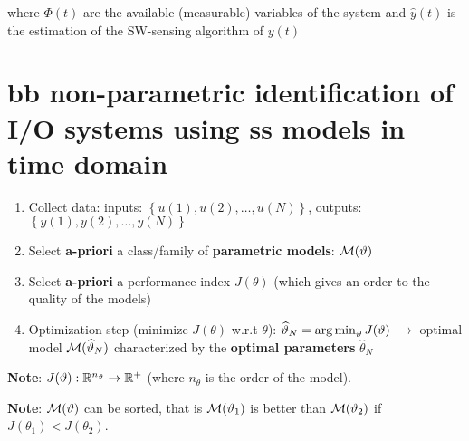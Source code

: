 where $\Phi(t)$ are the available (measurable) variables of the system and $\hat{y}(t)$ is the estimation of the SW-sensing algorithm of $y(t)$

\chapter{\acrlong{bb} non-parametric identification of I/O systems using \acrlong{ss} models in time domain}

\vspace{-12pt}
\begin{figure}[H]
    \centering
\end{figure}


\begin{recall}
\hfill \break
    \begin{enumerate}
        \item Collect data: inputs: $\left\{u(1), u(2), \ldots, u(N)\right\}$, outputs: $\left\{y(1), y(2), \ldots, y(N)\right\}$
        \item Select \textbf{a-priori} a class/family of \textbf{parametric models}: $\mathcal{M}(\vartheta)$
        \item Select \textbf{a-priori} a performance index $J(\theta)$ (which gives an order to the quality of the models)
        \item Optimization step (minimize $J(\theta)$ w.r.t $\theta$): $\widehat{\vartheta}_N = \operatorname*{arg\,min}_\vartheta J(\vartheta)$ $\rightarrow$ optimal model $\mathcal{M}(\widehat{\vartheta}_N)$ characterized by the \textbf{optimal parameters} $\hat{\theta}_N$
    \end{enumerate}
    
    \textbf{Note}:    $J(\vartheta): \mathbb{R}^{n_\vartheta} \rightarrow \mathbb{R}^+$ (where $n_\theta$ is the order of the model).
    
    \textbf{Note}: $\mathcal{M}(\vartheta)$ can be sorted, that is $\mathcal{M}(\vartheta_1)$ is better than $\mathcal{M}(\vartheta_2)$ if $J(\theta_1) < J(\theta_2)$.

\end{recall}

